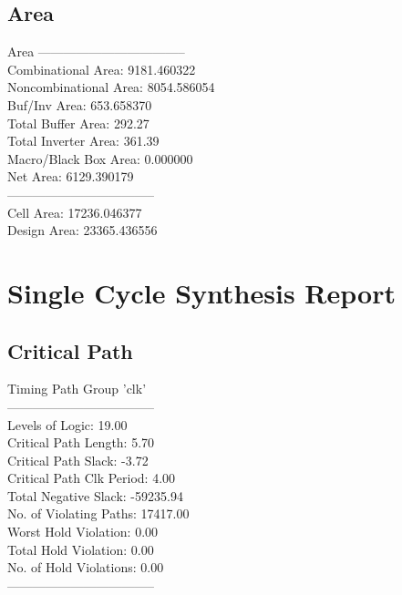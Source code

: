 \documentclass[12pt]{article}
\begin{document}
  \subsection{Area}
 Area
  -----------------------------------\\
  Combinational Area:     9181.460322\\
  Noncombinational Area:  8054.586054\\
  Buf/Inv Area:            653.658370\\
  Total Buffer Area:           292.27\\
  Total Inverter Area:         361.39\\
  Macro/Black Box Area:      0.000000\\
  Net Area:               6129.390179\\
  -----------------------------------\\
  Cell Area:             17236.046377\\
  Design Area:           23365.436556\\

\section{Single Cycle Synthesis Report}
\subsection{Critical Path}
Timing Path Group 'clk'\\
  -----------------------------------\\
  Levels of Logic:              19.00 \\
  Critical Path Length:          5.70\\
  Critical Path Slack:          -3.72\\
  Critical Path Clk Period:      4.00\\
  Total Negative Slack:     -59235.94\\
  No. of Violating Paths:    17417.00\\
  Worst Hold Violation:          0.00\\
  Total Hold Violation:          0.00\\
  No. of Hold Violations:        0.00\\
  -----------------------------------\\
\end{document}
